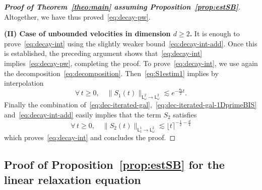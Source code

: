 \documentclass[11pt]{amsart}
\theoremstyle{definition}
\theoremstyle{remark}
\numberwithin{equation}{section}
\newcommand{\sfL}{\mathsf{L}}
\newcommand{\wangle}[1]{\lfloor #1 \rceil}
\begin{document}
\begin{proof}[{\bf Proof of Theorem~\ref{theo:main} assuming Proposition~\ref{prop:estSB}}]
  \medskip
  Altogether, we have thus proved~\eqref{eq:decay-pw}.
  \medskip
  
  \noindent
  {\bf (II) Case of unbounded velocities in dimension $d \ge 2$.} It is enough to prove~\eqref{eq:decay-int} using the slightly weaker bound~\eqref{eq:decay-int-add}. Once this is established, the preceding argument shows that~\eqref{eq:decay-int} implies~\eqref{eq:decay-pw}, completing the proof. To prove~\eqref{eq:decay-int}, we use again the decomposition~\eqref{eq:decomposition}. Then~\eqref{eq:S1estim1} implies by interpolation
  \begin{equation*}
    \forall \, t \ge 0, \quad \big\| S_1(t) \big\|_{\sfL^2_{\omega} \to \sfL^2_{\omega}} \lesssim e^{-\frac{\mathfrak{a}_0}{2}t}.
  \end{equation*}
  Finally the combination of~\eqref{eq:dec-iterated-gal},~\eqref{eq:dec-iterated-gal-1DprimeBIS} and~\eqref{eq:decay-int-add} easily implies that the term $S_2$ satisfies 
  \begin{equation*}
    \forall \, t \ge 0, \quad \big\| S_2(t) \big\|_{\sfL^1 _1 \to \sfL^2_{\omega}} \lesssim \wangle{t}^{-\frac12-\frac{d}4}
  \end{equation*}
  which proves~\eqref{eq:decay-int} and concludes the proof.
\end{proof}

\subsection{Proof of Proposition~\ref{prop:estSB} for the linear relaxation equation}
\label{subsec-split-relax}
\end{document}
